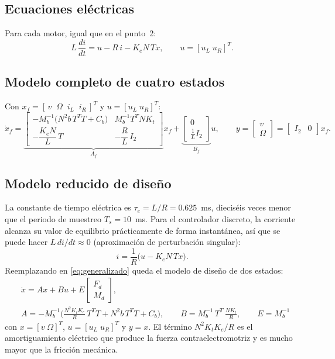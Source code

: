 \documentclass[11pt,letterpaper]{article}
\begin{document}
\subsection{Ecuaciones eléctricas}
Para cada motor, igual que en el punto~2:
\begin{equation}
  L\,\frac{di}{dt} = u - R\, i - K_e N\, T x, \qquad u = [u_L\;u_R]^T .
  \label{eq:electrica}
\end{equation}

\subsection{Modelo completo de cuatro estados}
Con $x_f = [\,v\;\;\Omega\;\;i_L\;\;i_R\,]^T$ y $u=[u_L\;u_R]^T$:
\begin{equation}
  \dot x_f =
  \underbrace{\begin{bmatrix}
    -M_b^{-1}\big(N^2 b\,T^TT + C_b\big) & M_b^{-1}T^T N K_t \\[4pt]
    -\dfrac{K_e N}{L}\,T & -\dfrac{R}{L}\,I_2
  \end{bmatrix}}_{A_f} x_f
  + \underbrace{\begin{bmatrix} 0 \\ \tfrac{1}{L} I_2 \end{bmatrix}}_{B_f} u,
  \qquad y = \begin{bmatrix} v\\ \Omega \end{bmatrix} = \begin{bmatrix} I_2 & 0 \end{bmatrix} x_f .
\end{equation}

\subsection{Modelo reducido de diseño}
La constante de tiempo eléctrica es $\tau_e = L/R = 0.625$~ms, dieciséis veces menor que el periodo de muestreo $T_s = 10$~ms. Para el controlador discreto, la corriente alcanza su valor de equilibrio prácticamente de forma instantánea, así que se puede hacer $L\,di/dt \approx 0$ (aproximación de perturbación singular):
\begin{equation}
  i = \frac{1}{R}\big(u - K_e N\, T x\big).
\end{equation}
Reemplazando en \eqref{eq:generalizado} queda el modelo de diseño de dos estados:
\begin{equation}
  \boxed{\;
  \begin{aligned}
  &\dot x = A x + B u + E\begin{bmatrix} F_d\\ M_d\end{bmatrix},\\
  &A = -M_b^{-1}\Big(\tfrac{N^2 K_t K_e}{R}\,T^TT + N^2 b\,T^TT + C_b\Big),\qquad
  B = M_b^{-1}\,T^T\,\tfrac{N K_t}{R},\qquad E = M_b^{-1}
  \end{aligned}\;}
  \label{eq:reducido}
\end{equation}
con $x=[v\;\Omega]^T$, $u=[u_L\;u_R]^T$ y $y = x$. El término $N^2K_tK_e/R$ es el amortiguamiento eléctrico que produce la fuerza contraelectromotriz y es mucho mayor que la fricción mecánica.
\end{document}
